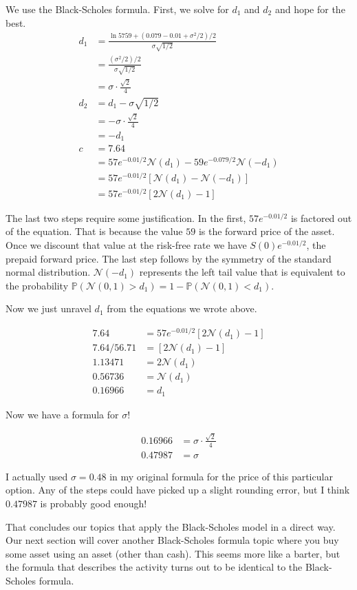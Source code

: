 \documentclass{ximera}
\begin{document}
\begin{solution}
We use the Black-Scholes formula. First, we solve for $d_1$ and $d_2$ and hope for the best.
	\begin{align*}
	d_1 			&=\frac{\ln{57}{59}+(0.079-0.01+\sigma^2/2)/2}{\sigma\sqrt{1/2}}\\
				&=\frac{(\sigma^2/2)/2}{\sigma\sqrt{1/2}}\\
				&=\sigma\cdot\frac{\sqrt{2}}{4}\\
	d_2			&=d_1-\sigma\sqrt{1/2}\\
				&=-\sigma\cdot\frac{\sqrt{2}}{4}\\
				&=-d_1\\
	c 			&=7.64\\
				&=57e^{-0.01/2}\mathcal{N}(d_1)-59e^{-0.079/2}\mathcal{N}(-d_1)\\
				&=57e^{-0.01/2}[\mathcal{N}(d_1)-\mathcal{N}(-d_1)]\\
				&=57e^{-0.01/2}[2\mathcal{N}(d_1)-1]
	\end{align*}

The last two steps require some justification. In the first, $57e^{-0.01/2}$ is factored out of the equation. That is because the value $59$ is the forward price of the asset. Once we discount that value at the risk-free rate we have $S(0)e^{-0.01/2}$, the prepaid forward price. The last step follows by the symmetry of the standard normal distribution. $\mathcal{N}(-d_1)$ represents the left tail value that is equivalent to the probability $\mathbb{P}(\mathcal{N}(0,1)>d_1)=1-\mathbb{P}(\mathcal{N}(0,1)<d_1)$. 

Now we just unravel $d_1$ from the equations we wrote above. 

	\begin{align*}
	7.64 		&=57e^{-0.01/2}[2\mathcal{N}(d_1)-1]\\
	7.64/56.71 	&=[2\mathcal{N}(d_1)-1]\\
	1.13471 	&=2\mathcal{N}(d_1)\\
	0.56736 	&=\mathcal{N}(d_1)\\
	0.16966	&=d_1
	\end{align*}

Now we have a formula for $\sigma$!

	\begin{align*}
	0.16966 	&=\sigma\cdot \frac{\sqrt{2}}{4}\\
	0.47987 	&=\sigma	
	\end{align*}

\end{solution}

I actually used $\sigma=0.48$ in my original formula for the price of this particular option. Any of the steps could have picked up a slight rounding error, but I think $0.47987$ is probably good enough!

That concludes our topics that apply the Black-Scholes model in a direct way. Our next section will cover another Black-Scholes formula topic where you buy some asset using an asset (other than cash). This seems more like a barter, but the formula that describes the activity turns out to be identical to the Black-Scholes formula. 
\end{document}
